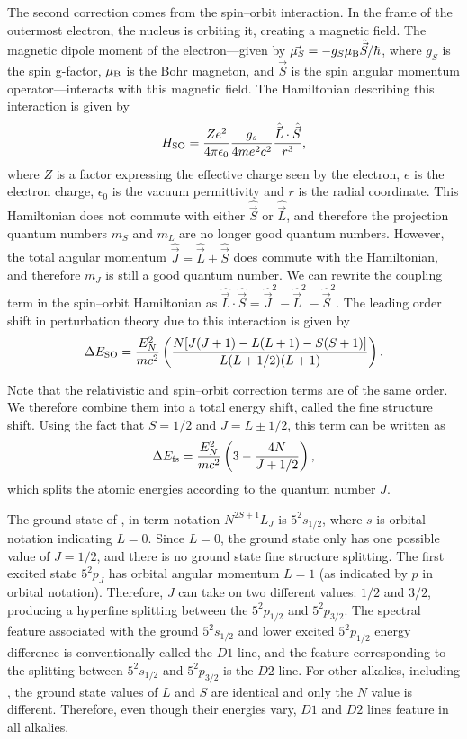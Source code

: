 The second correction comes from the spin--orbit interaction. In the frame of the outermost electron, the nucleus is orbiting it, creating a magnetic field. The magnetic dipole moment of the electron---given by $\vec{\mu_S}=-g_S\mu_{\rm B}\hat{\vec{S}}/\hbar$, where $g_S$ is the spin g-factor, $\mu_{\rm B}$ is the Bohr magneton, and $\vec{S}$ is the spin angular momentum operator---interacts with this magnetic field. The Hamiltonian describing this interaction is given by\cite{Thomas1926,Griffiths} 
\begin{equation}
H_{\rm SO}=\frac{Ze^2}{4\pi\epsilon_0}\frac{g_s}{4me^2c^2}\frac{\hat{\vec{L}}\cdot\hat{\vec{S}}}{r^3}, 
\end{equation}
where $Z$ is a factor expressing the effective charge seen by the electron, $e$ is the electron charge, $\epsilon_0$ is the vacuum permittivity and $r$ is the radial coordinate. This Hamiltonian does not commute with either $\hat{\vec{S}}$ or $\hat{\vec{L}}$, and therefore the projection quantum numbers $m_S$ and $m_L$ are no longer good quantum numbers. However, the total angular momentum $\hat{\vec{J}} = \hat{\vec{L}}+\hat{\vec{S}}$ does commute with the Hamiltonian, and therefore $m_J$ is still a good quantum number. We can rewrite the coupling term in the spin--orbit Hamiltonian as $\hat{\vec{L}}\cdot\hat{\vec{S}}=\hat{\vec{J}}^2-\hat{\vec{L}}^2-\hat{\vec{S}}^2$. The leading order shift in perturbation theory due to this interaction is given by 
\begin{equation}
\Delta E_{\rm SO} = \frac{E^2_N}{mc^2} \left(\frac{N[J(J+1)-L(L+1)-S(S+1)]}{L(L+1/2)(L+1)}\right).
\end{equation}

Note that the relativistic and spin--orbit correction terms are of the same order. We therefore combine them into a total energy shift, called the fine structure shift. Using the fact that $S=1/2$ and $J=L\pm1/2$, this term can be written as
\begin{equation}
\Delta E_{\rm fs} = \frac{E^2_N}{mc^2}\left(3 - \frac{4N}{J+1/2}\right),
\end{equation}
which splits the atomic energies according to the quantum number $J$. 

The ground state of \Rb{}, in term notation $N^{2S+1}L_J$ is $5^2s_{1/2}$, where $s$ is orbital notation indicating $L=0$. Since $L=0$, the ground state only has one possible value of $J=1/2$, and there is no ground state fine structure splitting. The first excited state $5^2p_J$ has orbital angular momentum $L=1$ (as indicated by $p$ in orbital notation). Therefore, $J$ can take on two different values: $1/2$ and $3/2$, producing a hyperfine splitting between the $5^2p_{1/2}$ and $5^2p_{3/2}$. The spectral feature associated with the ground $5^2s_{1/2}$ and lower excited $5^2p_{1/2}$ energy difference is conventionally called the $D1$ line, and the feature corresponding to the splitting between $5^2s_{1/2}$ and  $5^2p_{3/2}$ is the $D2$ line. For other alkalies, including \K{}, the ground state values of $L$ and $S$ are identical and only the $N$ value is different. Therefore, even though their energies vary, $D1$ and $D2$ lines feature in all alkalies.

